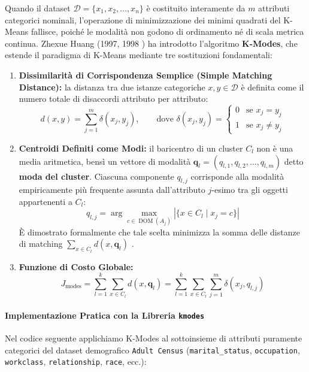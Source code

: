 Quando il dataset $\mathcal{D} = \{x_1, x_2, \dots, x_n\}$ è costituito interamente da $m$ attributi categorici nominali, l'operazione di minimizzazione dei minimi quadrati del K-Means fallisce, poiché le modalità non godono di ordinamento né di scala metrica continua. Zhexue Huang (1997, 1998 \cite{huang1998}) ha introdotto l'algoritmo \textbf{K-Modes}, che estende il paradigma di K-Means mediante tre sostituzioni fondamentali:
\begin{enumerate}
    \item \textbf{Dissimilarità di Corrispondenza Semplice (Simple Matching Distance):} la distanza tra due istanze categoriche $x, y \in \mathcal{D}$ è definita come il numero totale di disaccordi attributo per attributo:
    \begin{equation}
        d(x, y) = \sum_{j=1}^m \delta(x_j, y_j), \qquad \text{dove } \delta(x_j, y_j) = \begin{cases} 0 & \text{se } x_j = y_j \\ 1 & \text{se } x_j \ne y_j \end{cases}
    \end{equation}
    \item \textbf{Centroidi Definiti come Modi:} il baricentro di un cluster $C_l$ non è una media aritmetica, bensì un vettore di modalità $\mathbf{q}_l = (q_{l,1}, q_{l,2}, \dots, q_{l,m})$ detto \textbf{moda del cluster}. Ciascuna componente $q_{l,j}$ corrisponde alla modalità empiricamente più frequente assunta dall'attributo $j$-esimo tra gli oggetti appartenenti a $C_l$:
    \begin{equation}
        q_{l,j} = \arg\max_{c \in \operatorname{DOM}(A_j)} |\{ x \in C_l \mid x_j = c \}|
    \end{equation}
    È dimostrato formalmente che tale scelta minimizza la somma delle distanze di matching $\sum_{x \in C_l} d(x, \mathbf{q}_l)$ \cite{huang1998}.
    \item \textbf{Funzione di Costo Globale:}
    \begin{equation}
        J_{\text{modes}} = \sum_{l=1}^k \sum_{x \in C_l} d(x, \mathbf{q}_l) = \sum_{l=1}^k \sum_{x \in C_l} \sum_{j=1}^m \delta(x_j, q_{l,j})
    \end{equation}
\end{enumerate}

\paragraph{Implementazione Pratica con la Libreria \texttt{kmodes}}
Nel codice seguente applichiamo K-Modes al sottoinsieme di attributi puramente categorici del dataset demografico \texttt{Adult Census} (\texttt{marital\_status}, \texttt{occupation}, \texttt{workclass}, \texttt{relationship}, \texttt{race}, ecc.):

